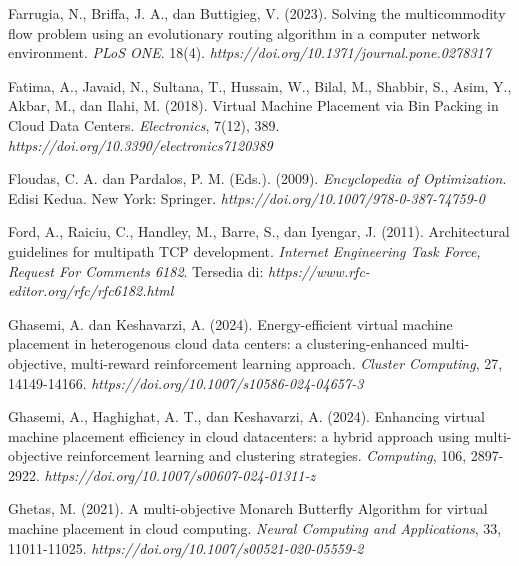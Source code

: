 \begin{thebibliography}{99}
	

	Farrugia, N., Briffa, J. A., dan Buttigieg, V. (2023). Solving the multicommodity flow problem using an evolutionary routing algorithm in a computer network environment. \textit{PLoS ONE}. 18(4). \textit{https://doi.org/10.1371/journal.pone.0278317}

  
  
  
	Fatima, A., Javaid, N., Sultana, T., Hussain, W., Bilal, M., Shabbir, S., Asim, Y., Akbar, M., dan Ilahi, M. (2018). Virtual Machine Placement via Bin Packing in Cloud Data Centers. \textit{Electronics}, 7(12), 389. \textit{https://doi.org/10.3390/electronics7120389} 
	

	
	

	Floudas, C. A. dan Pardalos, P. M. (Eds.). (2009). \textit{Encyclopedia of Optimization}. Edisi Kedua. New York: Springer. \textit{https://doi.org/10.1007/978-0-387-74759-0}
	
	

	Ford, A., Raiciu, C., Handley, M., Barre, S., dan Iyengar, J. (2011). Architectural guidelines for multipath TCP development. \textit{Internet Engineering Task Force, Request For Comments 6182}. Tersedia di: \textit{https://www.rfc-editor.org/rfc/rfc6182.html}
	
	

	Ghasemi, A. dan Keshavarzi, A. (2024). Energy-efficient virtual machine placement in heterogenous cloud data centers: a clustering-enhanced multi-objective, multi-reward reinforcement learning approach. \textit{Cluster Computing}, 27, 14149-14166. \textit{https://doi.org/10.1007/s10586-024-04657-3}
	
	

	Ghasemi, A., Haghighat, A. T., dan Keshavarzi, A. (2024). Enhancing virtual machine placement efficiency in cloud datacenters: a hybrid approach using multi-objective reinforcement learning and clustering strategies. \textit{Computing}, 106, 2897-2922. \textit{https://doi.org/10.1007/s00607-024-01311-z}
	
	

	Ghetas, M. (2021). A multi-objective Monarch Butterfly Algorithm for virtual machine placement in cloud computing. \textit{Neural Computing and Applications}, 33, 11011-11025. \textit{https://doi.org/10.1007/s00521-020-05559-2} 
	

\end{thebibliography}
